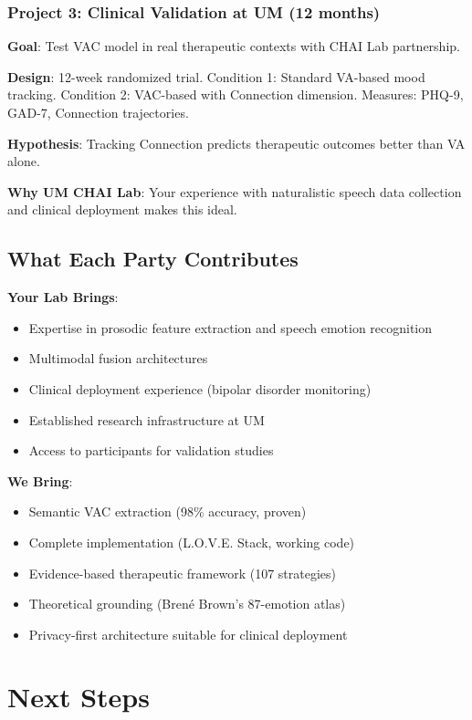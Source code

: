 \documentclass[11pt]{article}
\begin{document}
\subsubsection*{Project 3: Clinical Validation at UM (12 months)}

\textbf{Goal}: Test VAC model in real therapeutic contexts with CHAI Lab partnership.

\textbf{Design}: 12-week randomized trial. Condition 1: Standard VA-based mood tracking. Condition 2: VAC-based with Connection dimension. Measures: PHQ-9, GAD-7, Connection trajectories.

\textbf{Hypothesis}: Tracking Connection predicts therapeutic outcomes better than VA alone.

\textbf{Why UM CHAI Lab}: Your experience with naturalistic speech data collection and clinical deployment makes this ideal.

\subsection{What Each Party Contributes}

\textbf{Your Lab Brings}:
\begin{itemize}
    \item Expertise in prosodic feature extraction and speech emotion recognition
    \item Multimodal fusion architectures
    \item Clinical deployment experience (bipolar disorder monitoring)
    \item Established research infrastructure at UM
    \item Access to participants for validation studies
\end{itemize}

\textbf{We Bring}:
\begin{itemize}
    \item Semantic VAC extraction (98\% accuracy, proven)
    \item Complete implementation (L.O.V.E. Stack, working code)
    \item Evidence-based therapeutic framework (107 strategies)
    \item Theoretical grounding (Brené Brown's 87-emotion atlas)
    \item Privacy-first architecture suitable for clinical deployment
\end{itemize}

\section{Next Steps}
\end{document}
